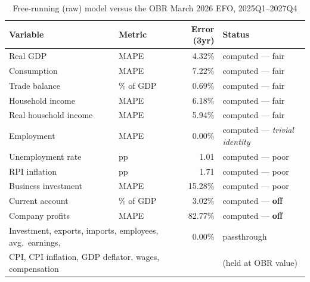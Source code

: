 \begin{table}[ht]
\centering
\caption{Free-running (raw) model versus the OBR March 2026 EFO, 2025Q1--2027Q4}
\label{tab:rawscore}
\small
\begin{tabular}{llrl}
\toprule
Variable & Metric & Error (3yr) & Status \\
\midrule
Real GDP & MAPE & 4.32\% & computed --- fair \\
Consumption & MAPE & 7.22\% & computed --- fair \\
Trade balance & \% of GDP & 0.69\% & computed --- fair \\
Household income & MAPE & 6.18\% & computed --- fair \\
Real household income & MAPE & 5.94\% & computed --- fair \\
Employment & MAPE & 0.00\% & computed --- \emph{trivial identity} \\
Unemployment rate & pp & 1.01 & computed --- poor \\
RPI inflation & pp & 1.71 & computed --- poor \\
Business investment & MAPE & 15.28\% & computed --- poor \\
Current account & \% of GDP & 3.02\% & computed --- \textbf{off} \\
Company profits & MAPE & 82.77\% & computed --- \textbf{off} \\
\midrule
\multicolumn{2}{l}{Investment, exports, imports, employees, avg.\ earnings,} & 0.00\% & passthrough \\
\multicolumn{2}{l}{CPI, CPI inflation, GDP deflator, wages, compensation} & & (held at OBR value) \\
\bottomrule
\end{tabular}


\end{table}
